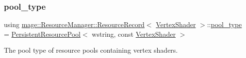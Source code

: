 \subsubsection{\texorpdfstring{pool\+\_\+type}{pool\_type}}
{\footnotesize\ttfamily using \hyperlink{structmage_1_1_resource_manager_1_1_resource_record}{mage\+::\+Resource\+Manager\+::\+Resource\+Record}$<$ \hyperlink{classmage_1_1_vertex_shader}{Vertex\+Shader} $>$\+::\hyperlink{structmage_1_1_resource_manager_1_1_resource_record_3_01_vertex_shader_01_4_acd93f247d6c25fc4f90f0ef2c29c1a74}{pool\+\_\+type} =  \hyperlink{classmage_1_1_persistent_resource_pool}{Persistent\+Resource\+Pool}$<$ wstring, const \hyperlink{classmage_1_1_vertex_shader}{Vertex\+Shader} $>$}

The pool type of resource pools containing vertex shaders. 